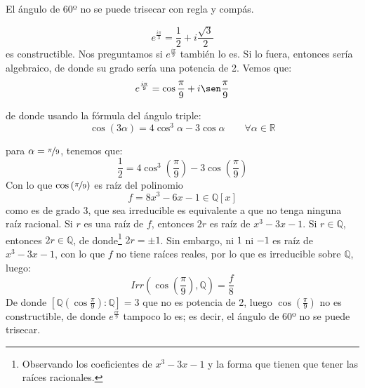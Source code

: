 \begin{ejemplo}
    El ángulo de 60º no se puede trisecar con regla y compás.
    \begin{figure}[H]
        \centering
    \end{figure}
    \begin{equation*}
        e^{\frac{i\pi}{3}} = \dfrac{1}{2} + i\dfrac{\sqrt{3}}{2}
    \end{equation*}
    es constructible. Nos preguntamos si $e^{\frac{i\pi}{9}}$ también lo es. Si lo fuera, entonces sería algebraico, de donde su grado sería una potencia de 2. Vemos que:
    \begin{equation*}
        e^{\frac{i\pi}{9}} = \cos \dfrac{\pi}{9} + i\sen \dfrac{\pi}{9}
    \end{equation*}

    de donde usando la fórmula del ángulo triple:
    \begin{equation*}
        \cos(3\alpha) = 4\cos^3\alpha - 3\cos \alpha \qquad \forall \alpha\in \mathbb{R}
    \end{equation*}

    para $\alpha = \nicefrac{\pi}{9}$, tenemos que:
    \begin{equation*}
        \dfrac{1}{2} = 4\cos^3\left(\frac{\pi}{9}\right) - 3\cos\left(\frac{\pi}{9}\right)
    \end{equation*}
    Con lo que $\cos\left(\nicefrac{\pi}{9}\right)$ es raíz del polinomio
    \begin{equation*}
        f = 8x^3-6x-1 \in \mathbb{Q}[x]
    \end{equation*}
    como es de grado 3, que sea irreducible es equivalente a que no tenga ninguna raíz racional. Si $r$ es una raíz de $f$, entonces $2r$ es raíz de $x^3-3x-1$. Si $r\in \mathbb{Q}$, entonces $2r\in \mathbb{Q}$, de donde\footnote{Observando los coeficientes de $x^3-3x-1$ y la forma que tienen que tener las raíces racionales.} $2r=\pm 1$. Sin embargo, ni $1$ ni $-1$ es raíz de $x^3-3x-1$, con lo que $f$ no tiene raíces reales, por lo que es irreducible sobre $\mathbb{Q}$, luego:
    \begin{equation*}
        Irr\left(\cos\left(\frac{\pi}{9}\right), \mathbb{Q}\right) = \frac{f}{8}
    \end{equation*}
    De donde $[\mathbb{Q}\left(\cos\frac{\pi}{9}\right) : \mathbb{Q}] = 3$ que no es potencia de 2, luego $\cos\left(\frac{\pi}{9}\right)$ no es constructible, de donde $e^{\frac{i\pi}{9}}$ tampoco lo es; es decir, el ángulo de $60$º no se puede trisecar.
\end{ejemplo}

